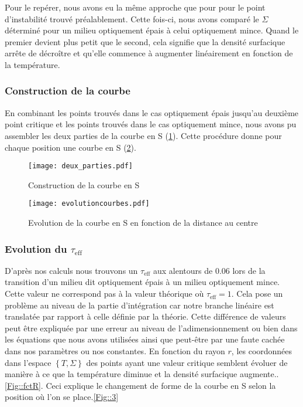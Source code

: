 Pour le repérer, nous avons eu la même approche que pour pour le point d'instabilité trouvé préalablement. Cette fois-ci, nous avons comparé le $\Sigma$ déterminé pour un milieu optiquement épais à celui optiquement mince. Quand le premier devient plus petit que le second, cela signifie que la densité surfacique arrête de décroître et qu'elle commence à augmenter linéairement en fonction de la température. 


\subsubsection{Construction de la courbe}

En combinant les points trouvés dans le cas optiquement épais jusqu'au deuxième point critique et les points trouvés dans le cas optiquement mince, nous avons pu assembler les deux parties de la courbe en S (\ref{Fig::construction_S}). Cette procédure donne pour chaque position une courbe en S (\ref{Fig::courbe_S_rayons}).

\begin{figure}[htb!]
	\centering
	\texttt{[image: deux\_parties.pdf]}
	\caption{Construction de la courbe en S}
	\label{Fig::construction_S}
\end{figure}

\begin{figure}[htb!]
	\centering
	\texttt{[image: evolutioncourbes.pdf]}
	\caption{Evolution de la courbe en S en fonction de la distance au centre}
	\label{Fig::courbe_S_rayons}
\end{figure}



\subsubsection{Evolution du $\tau_\textrm{eff}$}

D'après nos calculs nous trouvons un $\tau_\textrm{eff}$ aux alentours de $0.06$ lors de la transition d'un milieu dit optiquement épais à un milieu optiquement mince. Cette valeur ne correspond pas à la valeur théorique où $\tau_\textrm{eff} = 1$.
Cela pose un problème au niveau de la partie d'intégration car notre branche linéaire est translatée par rapport à celle définie par la théorie. 
Cette différence de valeurs peut être expliquée par une erreur au niveau de l’adimensionnement ou bien dans les équations que nous avons utilisées ainsi que peut-être par une faute cachée dans nos paramètres ou nos constantes. 
En fonction du rayon $r$, les coordonnées dans l'espace $\left\lbrace T, \Sigma\right\rbrace$ des points ayant une valeur critique semblent évoluer de manière à ce que la température diminue et la densité surfacique augmente..\ref{Fig::fctR}. Ceci explique le changement de forme de la courbe en S selon la position où l'on se place.\ref{Fig::3}

